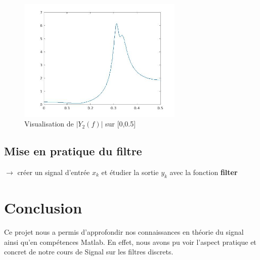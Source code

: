 \documentclass[12,french]{report}
\begin{document}
\begin{figure}[H]
	\center
	\includegraphics[width=0.7\textwidth]{./Images/freqz_Y2}
	\caption{Visualisation de $|Y_2(f)|$ sur [0,0.5]}
\end{figure}\vspace{0.2cm}


\section{Mise en pratique du filtre}

$\rightarrow$ créer un signal d'entrée $x_k$ et étudier la sortie $y_k$ avec la fonction \textbf{filter}


\chapter*{Conclusion}

Ce projet nous a permis d'approfondir nos connaissances en théorie du signal ainsi qu'en compétences Matlab. En effet, nous avons pu voir l'aspect pratique et concret de notre cours de Signal sur les filtres discrets. 
\end{document}
